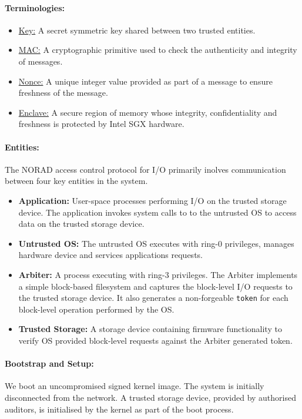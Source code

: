\documentclass[withindex,glossary]{cam-thesis}
\begin{document}
\paragraph{Terminologies:}
\begin{itemize}
\item \underline{Key:} A secret symmetric key shared between two trusted entities.
\item \underline{MAC:} A cryptographic primitive used to check the authenticity and integrity of messages.
\item \underline{Nonce:} A unique integer value provided as part of a message to ensure freshness of the message.
\item \underline{Enclave:} A secure region of memory whose integrity, confidentiality and freshness is protected by Intel SGX hardware.
\end{itemize}

\paragraph{Entities:}
The NORAD access control protocol for I/O primarily inolves communication between four key entities in the system.
\begin{itemize}
\item \textbf{Application:} User-space processes performing I/O on the trusted storage device.
The application invokes system calls to to the untrusted OS to access data on the trusted storage device.

\item \textbf{Untrusted OS:} The untrusted OS executes with ring-0 privileges, manages hardware device and services applications requests.

\item \textbf{Arbiter:} A process executing with ring-3 privileges.
The Arbiter implements a simple block-based filesystem and captures the block-level I/O requests to the trusted storage device.
It also generates a non-forgeable \texttt{token} for each block-level operation performed by the OS.

\item \textbf{Trusted Storage:} A storage device containing firmware functionality to verify OS provided block-level requests against the Arbiter generated token.

\end{itemize}


\paragraph{Bootstrap and Setup:}
We boot an uncompromised signed kernel image.
The system is initially disconnected from the network.
A trusted storage device, provided by authorised auditors, is initialised by the kernel as part of the boot process.
\end{document}
